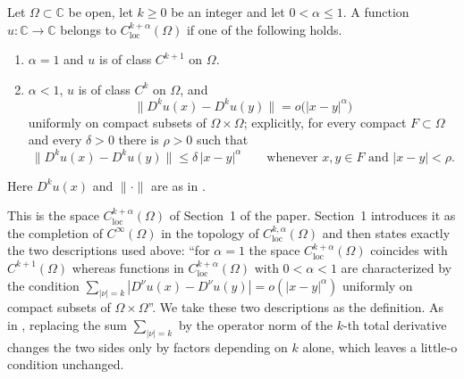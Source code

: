 \begin{definition}
Let $\Omega\subset\mathbb{C}$ be open, let $k\ge0$ be an integer and let
$0<\alpha\le1$.  A function $u\colon\mathbb{C}\to\mathbb{C}$ belongs to
$C^{k+\alpha}_{\mathrm{loc}}(\Omega)$ if one of the following holds.
\begin{enumerate}
\item[(a)] $\alpha=1$ and $u$ is of class $C^{k+1}$ on $\Omega$.
\item[(b)] $\alpha<1$, $u$ is of class $C^k$ on $\Omega$, and
\[
  \bigl\|D^ku(x)-D^ku(y)\bigr\|=o\bigl(|x-y|^\alpha\bigr)
\]
uniformly on compact subsets of $\Omega\times\Omega$; explicitly, for every
compact $F\subset\Omega$ and every $\delta>0$ there is $\rho>0$ such that
\[
  \bigl\|D^ku(x)-D^ku(y)\bigr\|\le\delta\,|x-y|^\alpha
  \qquad\text{whenever }x,y\in F\text{ and }|x-y|<\rho .
\]
\end{enumerate}
Here $D^ku(x)$ and $\|\cdot\|$ are as in .

This is the space $C^{k+\alpha}_{\mathrm{loc}}(\Omega)$ of Section~1 of the
paper.  Section~1 introduces it as the completion of $C^\infty(\Omega)$ in the
topology of $C^{k,\alpha}_{\mathrm{loc}}(\Omega)$ and then states exactly the
two descriptions used above: ``for $\alpha=1$ the space
$C^{k+\alpha}_{\mathrm{loc}}(\Omega)$ coincides with $C^{k+1}(\Omega)$ whereas
functions in $C^{k+\alpha}_{\mathrm{loc}}(\Omega)$ with $0<\alpha<1$ are
characterized by the condition $\sum_{|\nu|=k}|D^\nu u(x)-D^\nu
u(y)|=o(|x-y|^\alpha)$ uniformly on compact subsets of $\Omega\times\Omega$''.
We take these two descriptions as the definition.  As in
, replacing the sum $\sum_{|\nu|=k}$ by the operator
norm of the $k$-th total derivative changes the two sides only by factors
depending on $k$ alone, which leaves a little-o condition unchanged.
\end{definition}
